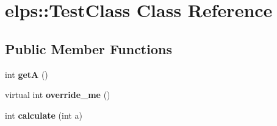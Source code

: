 \hypertarget{classelps_1_1_test_class}{\section{elps\+:\+:Test\+Class Class Reference}
\label{classelps_1_1_test_class}
}
\subsection*{Public Member Functions}
\begin{DoxyCompactItemize}
\item 
\hypertarget{classelps_1_1_test_class_ac37b3df6f4506953ee3752973a57d5d8}{int {\bfseries get\+A} ()}\label{classelps_1_1_test_class_ac37b3df6f4506953ee3752973a57d5d8}

\item 
\hypertarget{classelps_1_1_test_class_a075f90a0f7082152c40d3df6bbcdcc54}{virtual int {\bfseries override\+\_\+me} ()}\label{classelps_1_1_test_class_a075f90a0f7082152c40d3df6bbcdcc54}

\item 
\hypertarget{classelps_1_1_test_class_a3d59103b50c66ba2f101cec7e726fd60}{int {\bfseries calculate} (int a)}\label{classelps_1_1_test_class_a3d59103b50c66ba2f101cec7e726fd60}

\end{DoxyCompactItemize}
